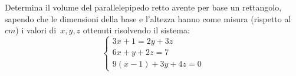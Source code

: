 \begin{esercizio}
 \label{ese:22.63}
Determina il volume del parallelepipedo retto avente
per base un rettangolo, sapendo che le dimensioni della base e
l'altezza hanno come misura (rispetto al~$\unit{cm}$) i valori
di~$x, y, z$ ottenuti risolvendo il sistema:
\[\left\{\begin{array}{l}3x+1=2y+3z \\6x+y+2z=7
\\9(x-1)+3y+4z=0 \end{array}\right.\]
\end{esercizio}


% 
% 
% 
